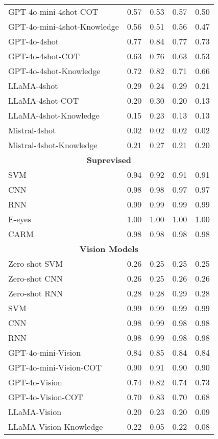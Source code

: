 \begin{table*}[th]
\begin{tabular}{lcccc}
GPT-4o-mini-4shot-COT & 0.57 & 0.53 & 0.57 & 0.50 \\
GPT-4o-mini-4shot-Knowledge & 0.56 & 0.51 & 0.56 & 0.47 \\
GPT-4o-4shot & 0.77 & 0.84 & 0.77 & 0.73 \\
GPT-4o-4shot-COT & 0.63 & 0.76 & 0.63 & 0.53 \\
GPT-4o-4shot-Knowledge & 0.72 & 0.82 & 0.71 & 0.66 \\
LLaMA-4shot & 0.29 & 0.24 & 0.29 & 0.21 \\
LLaMA-4shot-COT & 0.20 & 0.30 & 0.20 & 0.13 \\
LLaMA-4shot-Knowledge & 0.15 & 0.23 & 0.13 & 0.13 \\
Mistral-4shot & 0.02 & 0.02 & 0.02 & 0.02 \\
Mistral-4shot-Knowledge & 0.21 & 0.27 & 0.21 & 0.20 \\
        \midrule
        
        \multicolumn{5}{c}{\textbf{Suprevised}} \\
        SVM & 0.94 & 0.92 & 0.91 & 0.91 \\
        CNN & 0.98 & 0.98 & 0.97 & 0.97 \\
        RNN & 0.99 & 0.99 & 0.99 & 0.99 \\
        E-eyes & 1.00 & 1.00 & 1.00 & 1.00 \\
        CARM & 0.98 & 0.98 & 0.98 & 0.98 \\
\midrule
 \multicolumn{5}{c}{\textbf{Vision Models}} \\
           Zero-shot SVM & 0.26 & 0.25 & 0.25 & 0.25 \\
        Zero-shot CNN & 0.26 & 0.25 & 0.26 & 0.26 \\
        Zero-shot RNN & 0.28 & 0.28 & 0.29 & 0.28 \\
        SVM & 0.99 & 0.99 & 0.99 & 0.99 \\
        CNN & 0.98 & 0.99 & 0.98 & 0.98 \\
        RNN & 0.98 & 0.99 & 0.98 & 0.98 \\
GPT-4o-mini-Vision & 0.84 & 0.85 & 0.84 & 0.84 \\
GPT-4o-mini-Vision-COT & 0.90 & 0.91 & 0.90 & 0.90 \\
GPT-4o-Vision & 0.74 & 0.82 & 0.74 & 0.73 \\
GPT-4o-Vision-COT & 0.70 & 0.83 & 0.70 & 0.68 \\
LLaMA-Vision & 0.20 & 0.23 & 0.20 & 0.09 \\
LLaMA-Vision-Knowledge & 0.22 & 0.05 & 0.22 & 0.08 \\

        \bottomrule
    \end{tabular}
    \label{full}
\end{table*}


